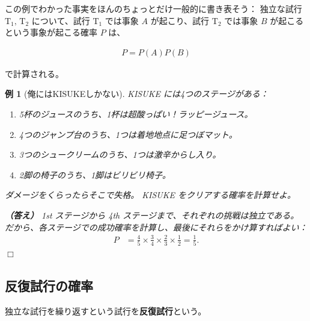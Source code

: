\documentclass[12pt]{ltjsarticle}\usepackage{ifthen}\newcounter{enlarge}\setcounter{enlarge}{1}
\def\qed{\hfill $\Box$}
\newtheorem{eg}{例}
\begin{document}
この例でわかった事実をほんのちょっとだけ一般的に書き表そう：
独立な試行 $\mathrm{T}_1,\, \mathrm{T}_2$ について、試行 $\mathrm{T}_1$ では事象 $A$ が起こり、試行 $\mathrm{T}_2$ では事象 $B$ が起こるという事象が起こる確率 $P$ は、
\begin{oframed}
  \begin{align}
     P = P(A)P(B) \label{eq:2.10}
  \end{align}
\end{oframed}
\noindent
で計算される。

\begin{eg}[俺にはKISUKEしかない]
  KISUKE には4つのステージがある：
  \begin{enumerate}
  \item 5杯のジュースのうち、1杯は超酸っぱい！ラッピージュース。
  \item 4つのジャンプ台のうち、1つは着地地点に足つぼマット。
  \item 3つのシュークリームのうち、1つは激辛からし入り。
  \item 2脚の椅子のうち、1脚はビリビリ椅子。
  \end{enumerate}
  ダメージをくらったらそこで失格。
  KISUKE をクリアする確率を計算せよ。

  \textbf{（答え）}
  1st ステージから 4th ステージまで、それぞれの挑戦は独立である。
  だから、各ステージでの成功確率を計算し、最後にそれらをかけ算すればよい：
  \begin{align}
    P &= \frac{4}{5} \times \frac{3}{4} \times \frac{2}{3} \times \frac{1}{2} =\frac{1}{5}.
  \end{align}
\qed\end{eg}

\subsection{反復試行の確率}

独立な試行を繰り返すという試行を\textbf{反復試行}という。
\end{document}
